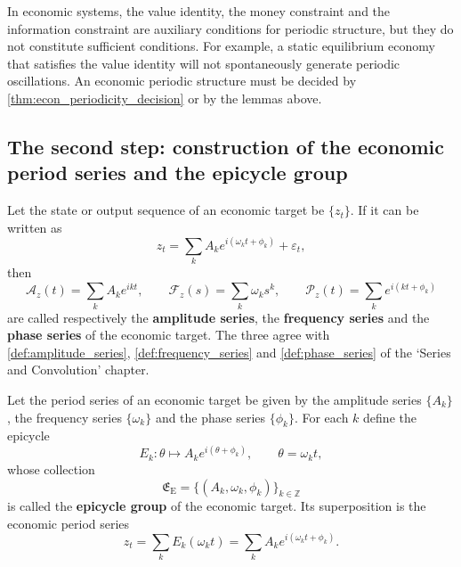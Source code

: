 \begin{remark}\label{rem:econ_invariant_not_period}
In economic systems, the value identity, the money constraint and the information constraint are auxiliary conditions for periodic structure, but they do not constitute sufficient conditions. For example, a static equilibrium economy that satisfies the value identity will not spontaneously generate periodic oscillations. An economic periodic structure must be decided by \cref{thm:econ_periodicity_decision} or by the lemmas above.
\end{remark}

\subsection{The second step: construction of the economic period series and the epicycle group}

\begin{definition}\label{def:econ_series}
Let the state or output sequence of an economic target be $\{z_t\}$. If it can be written as
\[
z_t=\sum_k A_k e^{i(\omega_k t+\phi_k)}+\varepsilon_t,
\]
then
\[
\mathcal A_z(t)=\sum_k A_k e^{ikt},\qquad
\mathcal F_z(s)=\sum_k \omega_k s^k,\qquad
\mathcal P_z(t)=\sum_k e^{i(kt+\phi_k)}
\]
are called respectively the \textbf{amplitude series}, the \textbf{frequency series} and the \textbf{phase series} of the economic target. The three agree with \cref{def:amplitude_series}, \cref{def:frequency_series} and \cref{def:phase_series} of the `Series and Convolution' chapter.
\end{definition}

\begin{definition}\label{def:econ_epicycle_group}
Let the period series of an economic target be given by the amplitude series $\{A_k\}$, the frequency series $\{\omega_k\}$ and the phase series $\{\phi_k\}$. For each $k$ define the epicycle
\[
E_k:\theta\mapsto A_k e^{i(\theta+\phi_k)},\qquad \theta=\omega_k t,
\]
whose collection
\[
\mathfrak E_{\mathrm{E}}=\{(A_k,\omega_k,\phi_k)\}_{k\in\mathbb Z}
\]
is called the \textbf{epicycle group} of the economic target. Its superposition is the economic period series
\[
z_t=\sum_k E_k(\omega_k t)=\sum_k A_k e^{i(\omega_k t+\phi_k)}.
\]
\end{definition}

